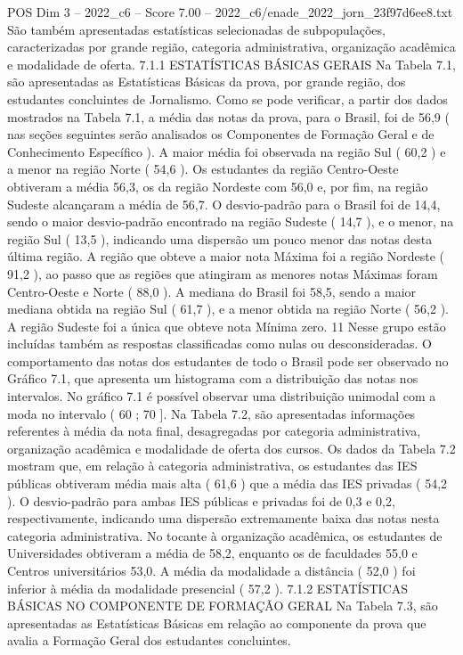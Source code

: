 \begin{textsample}{POS Dim 3 – 2022\_c6 – Score 7.00 – 2022\_c6/enade\_2022\_jorn\_23f97d6ee8.txt}
São também apresentadas estatísticas selecionadas de subpopulações, caracterizadas por grande região, categoria administrativa, organização acadêmica e modalidade de oferta. 7.1.1 ESTATÍSTICAS BÁSICAS GERAIS Na Tabela 7.1, são apresentadas as Estatísticas Básicas da prova, por grande região, dos estudantes concluintes de Jornalismo.
Como se pode verificar, a partir dos dados mostrados na Tabela 7.1, a média das notas da prova, para o Brasil, foi de 56,9 ( nas seções seguintes serão analisados os Componentes de Formação Geral e de Conhecimento Específico ).
A maior média foi observada na região Sul ( 60,2 ) e a menor na região Norte ( 54,6 ).
Os estudantes da região Centro-Oeste obtiveram a média 56,3, os da região Nordeste com 56,0 e, por fim, na região Sudeste alcançaram a média de 56,7.
O desvio-padrão para o Brasil foi de 14,4, sendo o maior desvio-padrão encontrado na região Sudeste ( 14,7 ), e o menor, na região Sul ( 13,5 ), indicando uma dispersão um pouco menor das notas desta última região.
A região que obteve a maior nota Máxima foi a região Nordeste ( 91,2 ), ao passo que as regiões que atingiram as menores notas Máximas foram Centro-Oeste e Norte ( 88,0 ).
A mediana do Brasil foi 58,5, sendo a maior mediana obtida na região Sul ( 61,7 ), e a menor obtida na região Norte ( 56,2 ).
A região Sudeste foi a única que obteve nota Mínima zero. 11 Nesse grupo estão incluídas também as respostas classificadas como nulas ou desconsideradas.
O comportamento das notas dos estudantes de todo o Brasil pode ser observado no Gráfico 7.1, que apresenta um histograma com a distribuição das notas nos intervalos.
No gráfico 7.1 é possível observar uma distribuição unimodal com a moda no intervalo ( 60 ; 70 ].
Na Tabela 7.2, são apresentadas informações referentes à média da nota final, desagregadas por categoria administrativa, organização acadêmica e modalidade de oferta dos cursos.
Os dados da Tabela 7.2 mostram que, em relação à categoria administrativa, os estudantes das IES públicas obtiveram média mais alta ( 61,6 ) que a média das IES privadas ( 54,2 ).
O desvio-padrão para ambas IES públicas e privadas foi de 0,3 e 0,2, respectivamente, indicando uma dispersão extremamente baixa das notas nesta categoria administrativa.
No tocante à organização acadêmica, os estudantes de Universidades obtiveram a média de 58,2, enquanto os de faculdades 55,0 e Centros universitários 53,0.
A média da modalidade a distância ( 52,0 ) foi inferior à média da modalidade presencial ( 57,2 ). 7.1.2 ESTATÍSTICAS BÁSICAS NO COMPONENTE DE FORMAÇÃO GERAL Na Tabela 7.3, são apresentadas as Estatísticas Básicas em relação ao componente da prova que avalia a Formação Geral dos estudantes concluintes.

\end{textsample}
